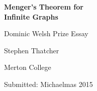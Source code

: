 \thispagestyle{empty}
\vfill
\begin{center}
{\Huge \bfseries
	Menger's Theorem for \\[1ex] Infinite Graphs
} \par
      
\large 
\vspace*{30mm} 
\logo \par
\vspace*{30mm}
Dominic Welsh Prize Essay \par
\vspace*{1ex}
{Stephen Thatcher} \par
\vspace*{1ex}
{Merton College} \par
\vspace*{8ex}
Submitted: Michaelmas 2015
  \end{center}
\vfill